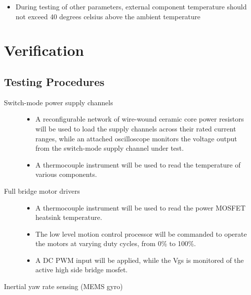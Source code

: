 \documentclass[12pt]{article}
\begin{document}
\begin{itemize}
\begin{description}
    \begin{itemize}
      \item During testing of other parameters, external component temperature should not exceed 40 degrees celsius above the ambient temperature
      \end{itemize}
 \end{description}
 
 \section{Verification}
 \subsection{Testing Procedures}
 \begin{description}
    \item[Switch-mode power supply channels] \newline
    
    \begin{itemize}
      \item A reconfigurable network of wire-wound ceramic core power resistors will be used to load the supply channels across their rated current ranges, while an attached oscilloscope monitors the voltage output from the switch-mode supply channel under test.
      \item A thermocouple instrument will be used to read the temperature of various components.
      \end{itemize}
    \item[Full bridge motor drivers] \newline
    
    \begin{itemize}
      \item A thermocouple instrument will be used to read the power MOSFET heatsink temperature.
      \item The low level motion control processor will be commanded to operate the motors at varying duty cycles, from 0\% to 100\%.
      \item A DC PWM input will be applied, while the Vgs is monitored of the active high side bridge mosfet.
      \end{itemize}
    \item[Inertial yaw rate sensing (MEMS gyro)] \newline
    

\end{description}
\end{itemize}
\end{document}
